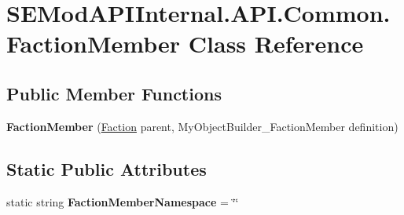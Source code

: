 \hypertarget{class_s_e_mod_a_p_i_internal_1_1_a_p_i_1_1_common_1_1_faction_member}{}\section{S\+E\+Mod\+A\+P\+I\+Internal.\+A\+P\+I.\+Common.\+Faction\+Member Class Reference}
\label{class_s_e_mod_a_p_i_internal_1_1_a_p_i_1_1_common_1_1_faction_member}
\subsection*{Public Member Functions}
\begin{DoxyCompactItemize}
\item 
\hypertarget{class_s_e_mod_a_p_i_internal_1_1_a_p_i_1_1_common_1_1_faction_member_a243e95b76062a3ac992782b00d9cbe76}{}{\bfseries Faction\+Member} (\hyperlink{class_s_e_mod_a_p_i_internal_1_1_a_p_i_1_1_common_1_1_faction}{Faction} parent, My\+Object\+Builder\+\_\+\+Faction\+Member definition)\label{class_s_e_mod_a_p_i_internal_1_1_a_p_i_1_1_common_1_1_faction_member_a243e95b76062a3ac992782b00d9cbe76}

\end{DoxyCompactItemize}
\subsection*{Static Public Attributes}
\begin{DoxyCompactItemize}
\item 
\hypertarget{class_s_e_mod_a_p_i_internal_1_1_a_p_i_1_1_common_1_1_faction_member_a20b8026258fd82a42e4e432cf1c990ba}{}static string {\bfseries Faction\+Member\+Namespace} = \char`\"{}\char`\"{}\label{class_s_e_mod_a_p_i_internal_1_1_a_p_i_1_1_common_1_1_faction_member_a20b8026258fd82a42e4e432cf1c990ba}

\end{DoxyCompactItemize}
